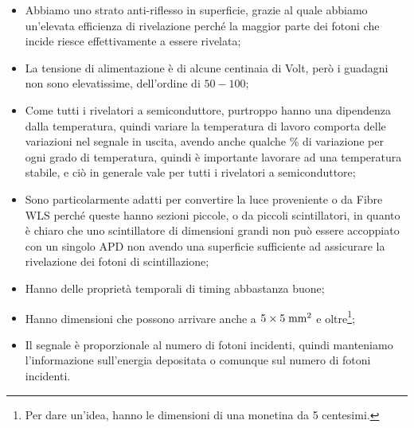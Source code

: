 \begin{itemize}[leftmargin=0.5cm]
   \item Abbiamo uno strato anti-riflesso in superficie, grazie al quale abbiamo un'elevata efficienza di rivelazione perché la maggior parte dei fotoni che incide riesce effettivamente a essere rivelata;
   \item La tensione di alimentazione è di alcune centinaia di Volt, però i guadagni non sono elevatissime, dell'ordine di $50-100$;
   \item Come tutti i rivelatori a semiconduttore, purtroppo hanno una dipendenza dalla temperatura, quindi variare la temperatura di lavoro comporta delle variazioni nel segnale in uscita, avendo anche qualche \% di variazione per ogni grado di temperatura, quindi è importante lavorare ad una temperatura stabile, e ciò in generale vale per tutti i rivelatori a semiconduttore;
   \item Sono particolarmente adatti per convertire la luce proveniente o da Fibre WLS perché queste hanno sezioni piccole, o da piccoli scintillatori, in quanto è chiaro che uno scintillatore di dimensioni grandi non può essere accoppiato con un singolo APD non avendo una superficie sufficiente ad assicurare la rivelazione dei fotoni di scintillazione;
   \item Hanno delle proprietà temporali di timing abbastanza buone;
   \item Hanno dimensioni che possono arrivare anche a $5 \times 5 \; \rm mm^2$ e oltre\footnote{Per dare un'idea, hanno le dimensioni di una monetina da 5 centesimi.};
   \item Il segnale è proporzionale al numero di fotoni incidenti, quindi manteniamo l'informazione sull'energia depositata o comunque sul numero di fotoni incidenti.
\end{itemize}

